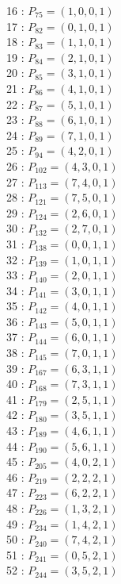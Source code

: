 \documentclass{article}
\begin{document}
{\begin{multicols}{3}
16 : $P_{75}=( 1, 0, 0, 1 )$\\
17 : $P_{82}=( 0, 1, 0, 1 )$\\
18 : $P_{83}=( 1, 1, 0, 1 )$\\
19 : $P_{84}=( 2, 1, 0, 1 )$\\
20 : $P_{85}=( 3, 1, 0, 1 )$\\
21 : $P_{86}=( 4, 1, 0, 1 )$\\
22 : $P_{87}=( 5, 1, 0, 1 )$\\
23 : $P_{88}=( 6, 1, 0, 1 )$\\
24 : $P_{89}=( 7, 1, 0, 1 )$\\
25 : $P_{94}=( 4, 2, 0, 1 )$\\
26 : $P_{102}=( 4, 3, 0, 1 )$\\
27 : $P_{113}=( 7, 4, 0, 1 )$\\
28 : $P_{121}=( 7, 5, 0, 1 )$\\
29 : $P_{124}=( 2, 6, 0, 1 )$\\
30 : $P_{132}=( 2, 7, 0, 1 )$\\
31 : $P_{138}=( 0, 0, 1, 1 )$\\
32 : $P_{139}=( 1, 0, 1, 1 )$\\
33 : $P_{140}=( 2, 0, 1, 1 )$\\
34 : $P_{141}=( 3, 0, 1, 1 )$\\
35 : $P_{142}=( 4, 0, 1, 1 )$\\
36 : $P_{143}=( 5, 0, 1, 1 )$\\
37 : $P_{144}=( 6, 0, 1, 1 )$\\
38 : $P_{145}=( 7, 0, 1, 1 )$\\
39 : $P_{167}=( 6, 3, 1, 1 )$\\
40 : $P_{168}=( 7, 3, 1, 1 )$\\
41 : $P_{179}=( 2, 5, 1, 1 )$\\
42 : $P_{180}=( 3, 5, 1, 1 )$\\
43 : $P_{189}=( 4, 6, 1, 1 )$\\
44 : $P_{190}=( 5, 6, 1, 1 )$\\
45 : $P_{205}=( 4, 0, 2, 1 )$\\
46 : $P_{219}=( 2, 2, 2, 1 )$\\
47 : $P_{223}=( 6, 2, 2, 1 )$\\
48 : $P_{226}=( 1, 3, 2, 1 )$\\
49 : $P_{234}=( 1, 4, 2, 1 )$\\
50 : $P_{240}=( 7, 4, 2, 1 )$\\
51 : $P_{241}=( 0, 5, 2, 1 )$\\
52 : $P_{244}=( 3, 5, 2, 1 )$\\

\end{multicols}}
\end{document}
